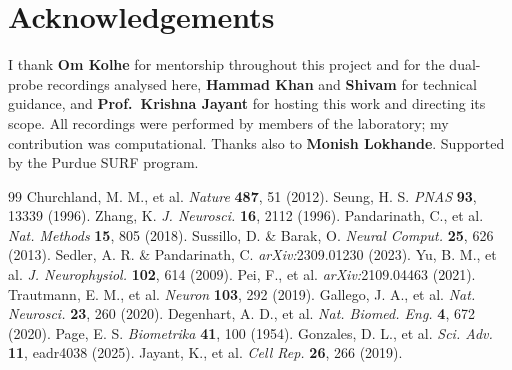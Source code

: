 \documentclass[10pt,twocolumn]{article}
\begin{document}
\section*{Acknowledgements}
\footnotesize
I thank \textbf{Om Kolhe} for mentorship throughout this project and for the
dual-probe recordings analysed here, \textbf{Hammad Khan} and \textbf{Shivam} for
technical guidance, and \textbf{Prof.\ Krishna Jayant} for hosting this work and
directing its scope. All recordings were performed by members of the laboratory;
my contribution was computational. Thanks also to \textbf{Monish Lokhande}.
Supported by the Purdue SURF program.

\balance
\begingroup\tiny
\begin{thebibliography}{99}\itemsep0pt\parskip0pt
 Churchland, M. M., et al. \emph{Nature} \textbf{487},
51 (2012).
 Seung, H. S. \emph{PNAS} \textbf{93}, 13339 (1996).
 Zhang, K. \emph{J. Neurosci.} \textbf{16}, 2112 (1996).
 Pandarinath, C., et al. \emph{Nat. Methods}
\textbf{15}, 805 (2018).
 Sussillo, D. \& Barak, O. \emph{Neural Comput.}
\textbf{25}, 626 (2013).
 Sedler, A. R. \& Pandarinath, C. \emph{arXiv:}2309.01230
(2023).
 Yu, B. M., et al. \emph{J. Neurophysiol.} \textbf{102}, 614
(2009).
 Pei, F., et al. \emph{arXiv:}2109.04463 (2021).
 Trautmann, E. M., et al. \emph{Neuron} \textbf{103}, 292
(2019).
 Gallego, J. A., et al. \emph{Nat. Neurosci.} \textbf{23},
260 (2020).
 Degenhart, A. D., et al. \emph{Nat. Biomed. Eng.}
\textbf{4}, 672 (2020).
 Page, E. S. \emph{Biometrika} \textbf{41}, 100 (1954).
 Gonzales, D. L., et al. \emph{Sci. Adv.} \textbf{11},
eadr4038 (2025).
 Jayant, K., et al. \emph{Cell Rep.} \textbf{26}, 266
(2019).
\end{thebibliography}
\endgroup
\end{document}
